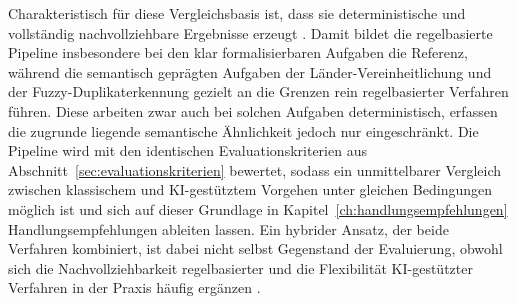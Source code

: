 Charakteristisch für diese Vergleichsbasis ist, dass sie deterministische und vollständig nachvollziehbare Ergebnisse erzeugt \autocite{walhaDataIntegrationTraditional2024,nagabhyruBridgingTraditionalETL2022}. Damit bildet die regelbasierte Pipeline insbesondere bei den klar formalisierbaren Aufgaben die Referenz, während die semantisch geprägten Aufgaben der Länder-Vereinheitlichung und der Fuzzy-Duplikaterkennung gezielt an die Grenzen rein regelbasierter Verfahren führen. Diese arbeiten zwar auch bei solchen Aufgaben deterministisch, erfassen die zugrunde liegende semantische Ähnlichkeit jedoch nur eingeschränkt. Die Pipeline wird mit den identischen Evaluationskriterien aus Abschnitt~\ref{sec:evaluationskriterien} bewertet, sodass ein unmittelbarer Vergleich zwischen klassischem und \ac{KI}-gestütztem Vorgehen unter gleichen Bedingungen möglich ist und sich auf dieser Grundlage in Kapitel~\ref{ch:handlungsempfehlungen} Handlungsempfehlungen ableiten lassen. Ein hybrider Ansatz, der beide Verfahren kombiniert, ist dabei nicht selbst Gegenstand der Evaluierung, obwohl sich die Nachvollziehbarkeit regelbasierter und die Flexibilität \ac{KI}-gestützter Verfahren in der Praxis häufig ergänzen \autocite{walhaDataIntegrationTraditional2024,kasireddyRoleAIModern2026}.

